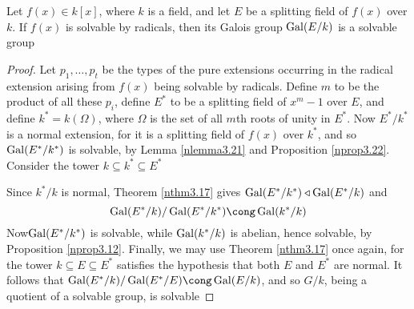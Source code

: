 \documentclass[11pt]{article}
\begin{document}
\begin{theorem}[Galois]
Let \(f(x)\in k[x]\), where \(k\) is a field, and let \(E\) be a splitting
field of \(f(x)\) over \(k\). If \(f(x)\) is solvable by radicals, then its
Galois group \(\operatorname{Gal}(E/k)\) is a solvable group
\end{theorem}
\begin{proof}
Let \(p_1,\dots,p_t\) be the types of the pure extensions occurring in the
radical extension arising from \(f(x)\) being solvable by radicals. Define
\(m\) to be the product of all these \(p_i\), define \(E^*\) to be a
splitting field of \(x^m-1\) over \(E\), and define \(k^*=k(\Omega)\), where \(\Omega\) is
the set of all \(m\)th roots of unity in \(E^*\). Now \(E^*/k^*\) is a
normal extension, for it is a splitting field of \(f(x)\) over \(k^*\), and
so \(\operatorname{Gal}(E^*/k^*)\) is solvable, by Lemma \ref{nlemma3.21} and Proposition
\ref{nprop3.22}. Consider the tower \(k\subseteq k^*\subseteq E^*\)
\begin{center}
\end{center}
Since \(k^*/k\) is normal, Theorem \ref{nthm3.17} gives
\(\operatorname{Gal}(E^*/k^*)\triangleleft\operatorname{Gal}(E^*/k)\) and 
\begin{equation*}
\Gal(E^*/k)/\Gal(E^*/k^*)\cong\Gal(k^*/k)
\end{equation*}
Now\(\operatorname{Gal}(E^*/k^*)\) is solvable, while \(\operatorname{Gal}(k^*/k)\) is abelian, hence
solvable, by Proposition \ref{nprop3.12}. Finally, we may use Theorem
\ref{nthm3.17} once again, for the tower \(k\subseteq E\subseteq E^*\)
satisfies the hypothesis that both \(E\) and \(E^*\) are normal. It follows
that \(\Gal(E^*/k)/\Gal(E^*/E)\cong\Gal(E/k)\), and so \(G/k\), being a
quotient of a solvable group, is solvable
\end{proof}
\end{document}
